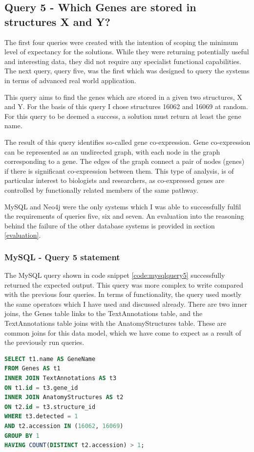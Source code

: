 \subsection*{Query 5 - Which Genes are stored in structures X and Y?}\label{query5}
The first four queries were created with the intention of scoping the minimum level of expectancy for the solutions. While they were returning potentially useful and interesting data, they did not require any specialist functional capabilities. The next query, query five, was the first which was designed to query the systems in terms of advanced real world application.

This query aims to find the genes which are stored in a given two structures, X and Y. For the basis of this query I chose structures 16062 and 16069 at random. For this query to be deemed a success, a solution must return at least the gene name.

The result of this query identifies so-called gene co-expression. Gene co-expression can be represented as an undirected graph, with each node in the graph corresponding to a gene. The edges of the graph connect a pair of nodes (genes) if there is significant co-expression between them. This type of analysis, is of particular interest to biologists and researchers, as co-expressed genes are controlled by functionally related members of the same pathway.

MySQL and Neo4j were the only systems which I was able to successfully fulfil the requirements of queries five, six and seven. An evaluation into the reasoning behind the failure of the other database systems is provided in section \ref{evaluation}.

\subsubsection*{MySQL - Query 5 statement}\label{mysqlquery5statement}
The MySQL query shown in code snippet \ref{code:mysqlquery5} successfully returned the expected output. This query was more complex to write compared with the previous four queries. In terms of functionality, the query used mostly the same operators which I have used and discussed already. There are two inner joins, the Genes table links to the TextAnnotations table, and the TextAnnotations table joins with the AnatomyStructures table. These are common joins for this data model, which we have come to expect as a result of the previously run queries.

\begin{lstlisting}[language=SQL, caption=MySQL query 5 statement. Which Genes are stored in structures X and Y?., label=code:mysqlquery5]
SELECT t1.name AS GeneName
FROM Genes AS t1
INNER JOIN TextAnnotations AS t3
ON t1.id = t3.gene_id
INNER JOIN AnatomyStructures AS t2
ON t2.id = t3.structure_id
WHERE t3.detected = 1
AND t2.accession IN (16062, 16069)
GROUP BY 1
HAVING COUNT(DISTINCT t2.accession) > 1;
\end{lstlisting}

